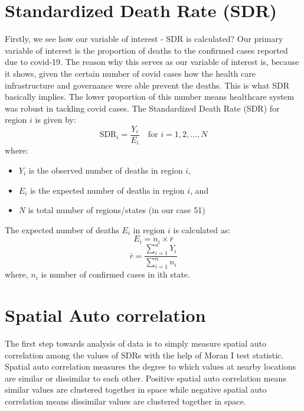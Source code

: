 \documentclass[enabledeprecatedfontcommands,parskip=half,twoside=semi,BCOR=0mm]{scrreprt}
\numberwithin{equation}{chapter}
\theoremstyle{definition}
\theoremstyle{remark}
\begin{document}
    \section{Standardized Death Rate (SDR)}
    Firstly, we see how our variable of interest - SDR is calculated?
    Our primary variable of interest is the proportion of deaths to the confirmed cases reported due to covid-19. The reason why this serves as our variable of interest is, because it shows, given the certain number of covid cases how the health care infrastructure and governance were able prevent the deaths. This is what SDR basically implies. The lower proportion of this number means healthcare system was robust in tackling covid cases.
    The Standardized Death Rate (SDR) for region \(i\) is given by:
    \[
    \text{SDR}_i = \frac{Y_i}{E_i} \quad \text{for } i = 1, 2, \ldots, N
    \]
    where:
    \begin{itemize}
        \item \(Y_i\) is the observed number of deaths in region \(i\),
        \item \(E_i\) is the expected number of deaths in region \(i\), and
        \item \(N\) is total number of regions/states (in our case 51)
    \end{itemize}

    The expected number of deaths \(E_i\) in region \(i\) is calculated as:
    \[
    E_i = n_i \times \bar{r}
    \]
    \[
    \bar{r} = \frac{\sum_{i=1}^{n} Y_i}{\sum_{i=1}^{n} n_i}
    \]
    where, \(n_i\) is number of confirmed cases in ith state.
    
    \section{Spatial Auto correlation}
    
    The first step towards analysis of data is to simply measure spatial auto correlation among the values of SDRs with the help of Moran I test statistic. Spatial auto correlation measures the degree to which values at nearby locations are similar or dissimilar to each other. Positive spatial auto correlation means similar values are clustered together in space while negative spatial auto correlation means dissimilar values are clustered together in space. 
    
\end{document}
